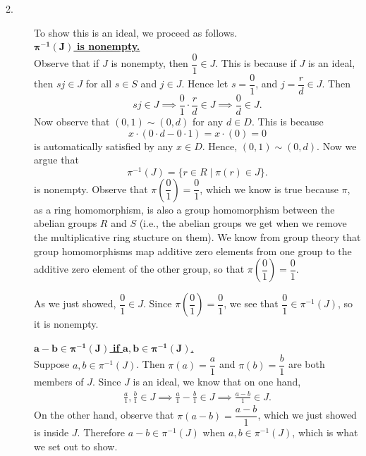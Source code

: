 \begin{prf}
\begin{description}
        \item[2.]
        To show this is an ideal, we proceed as follows.\\
        \underline{$\bm{\pi^{-1}(J)} $ \textbf{is nonempty.}}\\[1.2ex]
        Observe that if $J$ is nonempty, then $\dfrac{0}{1} \in J$. This
        is because if $J$ is an ideal, then $sj \in J$ for all $s \in
        S$ and $j \in J$. Hence let $s = \dfrac{0}{1}$, and $j = \dfrac{r}{d} \in
        J$. Then 
        \[
            sj \in J \implies \dfrac{0}{1}\cdot \dfrac{r}{d} \in J \implies \frac{0}{d} \in J.  
        \]
        Now observe that $(0, 1) \sim (0, d)$ for any $d \in D$. This is
        because 
        \[
            x \cdot(0 \cdot d - 0 \cdot 1) = x \cdot (0) = 0
        \]
        is automatically satisfied by any $x \in D$.
        Hence, $(0, 1) \sim (0, d)$. Now we argue that
        \[
            \pi^{-1}(J) = \{r \in R \mid \pi(r) \in J\}.
        \]
        is nonempty. Observe that $\pi\left(\dfrac{0}{1}\right) =
        \dfrac{0}{1}$, which we know is true because $\pi$, as a ring
        homomorphism, is also a group homomorphism between the abelian
        groups $R$ and $S$ (i.e., the abelian groups we get when we remove
        the multiplicative ring stucture on them). We know from group theory
        that group homomorphisms map additive zero elements from one group
        to the additive zero element of the other group, so that $\pi\left(\dfrac{0}{1}\right) =
        \dfrac{0}{1}$.
        
        As we just showed, $\dfrac{0}{1} \in J$. Since
        $\pi\left(\dfrac{0}{1}\right) = \dfrac{0}{1}$,
        we see that $\dfrac{0}{1} \in \pi^{-1}(J)$, so it is nonempty. 
    
        \noindent\underline{$\bm{a - b \in \pi^{-1}(J)}$ \textbf{if} $\bm{a, b
        \in \pi^{-1}(J)}$.}\\[1.2ex]
        Suppose $a, b \in \pi^{-1}(J)$. Then $\pi(a) = \dfrac{a}{1}$ and
        $\pi(b) = \dfrac{b}{1}$ are both members of $J$. Since $J$ is an
        ideal, we know that on one hand,
        \begin{align*}
            \frac{a}{1}, \frac{b}{1} \in J \implies \frac{a}{1} - \frac{b}{1} \in J
            \implies \frac{a - b}{1} \in J.
        \end{align*}
        On the other hand, observe that $\pi(a - b) = \dfrac{a - b}{1}$,
        which we just showed is inside $J$. Therefore $a - b \in
        \pi^{-1}(J)$ when $a, b \in \pi^{-1}(J)$, which is what we set out
        to show.
    

\end{description}
\end{prf}
